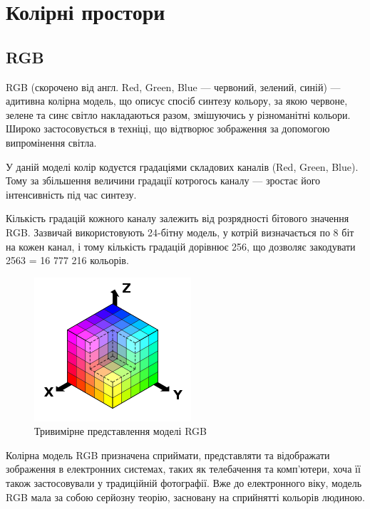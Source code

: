 \section{Колірні простори}
\subsection{RGB}
RGB (скорочено від англ. Red, Green, Blue — червоний, зелений, синій) — адитивна колірна модель, що описує спосіб синтезу кольору, за якою червоне, зелене та синє світло накладаються разом, змішуючись у різноманітні кольори. Широко застосовується в техніці, що відтворює зображення за допомогою випромінення світла.

У даній моделі колір кодуєтся градаціями складових каналів (Red, Green, Blue). Тому за збільшення величини градації котрогось каналу — зростає його інтенсивність під час синтезу.

Кількість градацій кожного каналу залежить від розрядності бітового значення RGB. Зазвичай використовують 24-бітну модель, у котрій визначається по 8 біт на кожен канал, і тому кількість градацій дорівнює 256, що дозволяє закодувати 2563 = 16 777 216  кольорів.

\begin{figure}[H]
	\centering
	\includegraphics[width=0.7\linewidth]{theory/img/rgb_representation}
	\caption{Тривимірне представлення моделі RGB}
\end{figure}

Колірна модель RGB призначена сприймати, представляти та відображати зображення в електронних системах, таких як телебачення та комп'ютери, хоча її також застосовували у традиційній фотографії. Вже до електронного віку, модель RGB мала за собою серйозну теорію, засновану на сприйнятті кольорів людиною.

